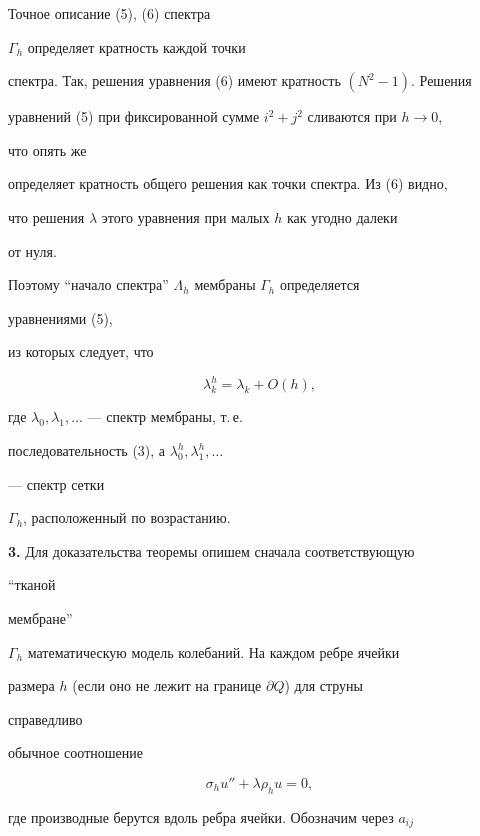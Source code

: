  


Точное описание (5), (6) спектра 


$\Gamma_h$ определяет кратность каждой точки 


спектра. Так, решения уравнения (6) имеют кратность $(N^2-1)$. Решения 


уравнений (5) при фиксированной сумме $i^2+j^2$ сливаются при $h\to0$, 


что опять же 


определяет кратность общего решения как точки спектра. Из (6) видно, 


что решения $\lambda$ этого уравнения при малых $h$ как угодно далеки 


от нуля. 


Поэтому ``начало спектра'' $\Lambda_h$ мембраны $\Gamma_h$ определяется 


уравнениями (5), 


из которых следует, что 


\begin{equation} 


\lambda^h_k=\lambda_k+O(h), 


\end{equation} 


где $\lambda_0,\lambda_1,\dotsc$ --- спектр мембраны, т.\,е. 


последовательность (3), а $\lambda_0^h,\lambda_1^h,\dotsc$ 


--- спектр сетки 


$\Gamma_h$, расположенный по возрастанию. 


\medskip 


 


{\bf 3.} Для доказательства теоремы опишем сначала соответствующую 


``тканой 


мембране'' 


$\Gamma_h$ математическую модель колебаний. На каждом ребре ячейки 


размера $h$ (если оно не лежит на границе $\partial Q$) для струны 


справедливо 


обычное соотношение 


\begin{equation} 


\sigma_h u''+\lambda\rho_h u=0, 


\end{equation} 


где производные берутся вдоль ребра ячейки. Обозначим через $a_{ij}$ 


